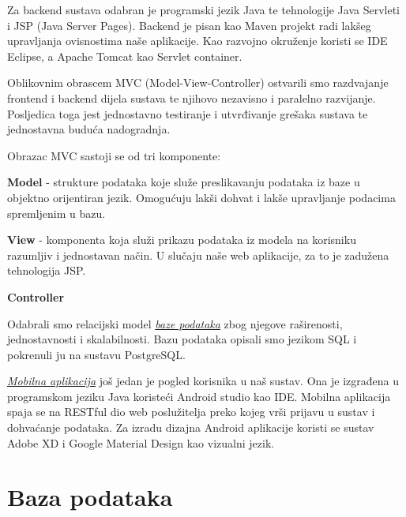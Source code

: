 	Za backend sustava odabran je programski jezik Java te tehnologije Java Servleti i JSP (Java Server Pages). Backend je pisan kao Maven projekt radi lakšeg upravljanja ovisnostima naše aplikacije. Kao razvojno okruženje koristi se IDE Eclipse, a Apache Tomcat kao Servlet container.
	
	Oblikovnim obrascem MVC (Model-View-Controller) ostvarili smo razdvajanje frontend i backend dijela sustava te njihovo nezavisno i paralelno razvijanje. Posljedica toga jest jednostavno testiranje i utvrđivanje grešaka sustava te jednostavna buduća nadogradnja.
	
	Obrazac MVC sastoji se od tri komponente:
	\begin{packed_item}
		
		\item \textbf{Model} - strukture podataka koje služe preslikavanju podataka iz baze u objektno orijentiran jezik. Omogućuju lakši dohvat i lakše upravljanje podacima spremljenim u bazu.
		\item \textbf{View} - komponenta koja služi prikazu podataka iz modela na korisniku razumljiv i jednostavan način. U slučaju naše web aplikacije, za to je zadužena tehnologija JSP.
		\item \textbf{Controller}
		
	\end{packed_item}
	
	Odabrali smo relacijski model \textit{\underline{baze podataka}} zbog njegove raširenosti, jednostavnosti i skalabilnosti. Bazu podataka opisali smo jezikom SQL i pokrenuli ju na sustavu PostgreSQL.

	\textit{\underline{Mobilna aplikacija}} još jedan je pogled korisnika u naš sustav. Ona je izgrađena u programskom jeziku Java koristeći Android studio kao IDE. Mobilna aplikacija spaja se na RESTful dio web poslužitelja preko kojeg vrši prijavu u sustav i dohvaćanje podataka. Za izradu dizajna Android aplikacije koristi se sustav Adobe XD i Google Material Design kao vizualni jezik.
		
		\eject
				
		\section{Baza podataka}
			
